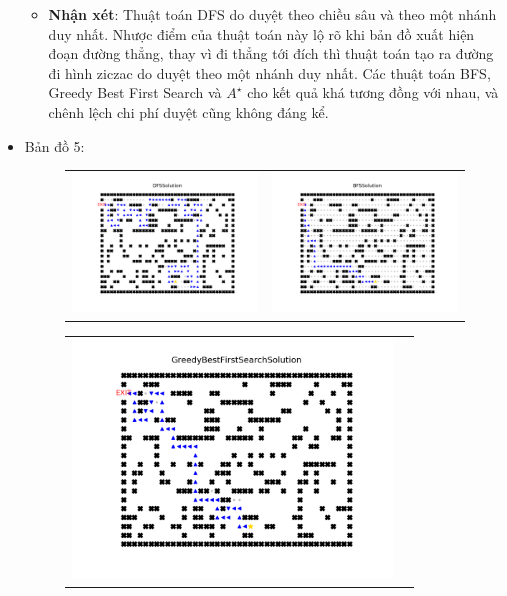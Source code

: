 \documentclass[11pt]{article} %
\begin{document}
\begin{itemize}
\begin{figure}[h]
\begin{tabular}{cc}
		\end{tabular}
	\end{figure}
	\begin{itemize}
		\item \textbf{Nhận xét}: Thuật toán DFS do duyệt theo chiều sâu và theo một nhánh duy nhất. Nhược điểm của thuật toán này lộ rõ khi bản đồ xuất hiện đoạn đường thẳng, thay vì đi thẳng tới đích thì thuật toán tạo ra đường đi hình ziczac do duyệt theo một nhánh duy nhất. Các thuật toán BFS, Greedy Best First Search và $A^{\star}$ cho kết quả khá tương đồng với nhau, và chênh lệch chi phí duyệt cũng không đáng kể.
	\end{itemize}

		\newpage
	\item Bản đồ 5:
	\begin{figure}[h] \label{bd5}
		\centering
		\begin{tabular}{cc}
			\includegraphics[width=8.5cm]{Figures/fg5_dfs.png} &
			\includegraphics[width=8.5cm]{Figures/fg5_bfs.png} \\
		\end{tabular}
	\end{figure}
	\begin{figure}[h] \label{Hình 5}
		\centering
		\begin{tabular}{cc}
			\includegraphics[width=8.5cm]{Figures/fg5_gbfs.png} &

\end{tabular}
\end{figure}
\end{itemize}
\end{document}
